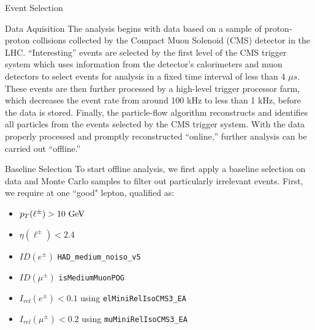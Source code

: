 \begin{section}{Event Selection}
\begin{subsection}{Data Aquisition}
The analysis begins with data based on a sample of proton-proton collisions collected by the Compact Muon Solenoid (CMS) detector in the LHC. ``Interesting'' events are selected by the first level of the CMS trigger system which uses information from the detector's calorimeters and muon detectors to select events for analysis in a fixed time interval of less than 4 $\mu s$. These events are then further processed by a high-level trigger processor farm, which decreases the event rate from around 100 kHz to less than 1 kHz, before the data is stored. Finally, the particle-flow algorithm reconstructs and identifies all particles from the events selected by the CMS trigger system. With the data properly processed and promptly reconstructed ``online,'' further analysis can be carried out ``offline.''
\end{subsection}
\begin{subsection}{Baseline Selection}
To start offline analysis, we first apply a baseline selection on data and Monte Carlo samples to filter out particularly irrelevant events. First, we require at one ``good" lepton, qualified as:
\begin{itemize}
    \item $p_{T}(\ell^{\pm}) > 10\textnormal{ GeV}$
    \item $\eta(\ell^{\pm}) < 2.4$
    \item $ID(e^{\pm})$ \verb|HAD_medium_noiso_v5|
    \item $ID(\mu^{\pm})$ \verb|isMediumMuonPOG|
    \item $I_{rel}(e^{\pm}) < 0.1$ using \verb|elMiniRelIsoCMS3_EA|
    \item $I_{rel}(\mu^{\pm}) < 0.2$ using \verb|muMiniRelIsoCMS3_EA|
\end{itemize}


\end{subsection}
\end{section}
